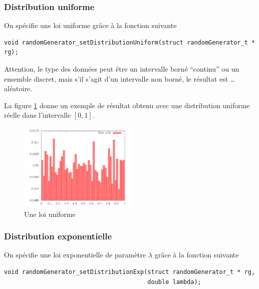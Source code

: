 %
\subsubsection{Distribution uniforme}

   On spécifie une loi uniforme grâce à la fonction suivante

\begin{verbatim}
void randomGenerator_setDistributionUniform(struct randomGenerator_t * rg);
\end{verbatim}

   Attention, le type des données peut être un intervalle borné
``continu'' ou un ensemble discret, mais s'il s'agit d'un intervalle
non borné, le résultat est \ldots {} aléatoire.

   La figure \ref{figure:distuni} donne un exemple de résultat obtenu
avec une distribution uniforme réelle dans l'intervalle $[0, 1]$.

\begin{figure}[h]
\begin{center}
\includegraphics[width=0.5\textwidth]{DistributionUnif.png}
\caption{Une loi uniforme\label{figure:distuni}}
\end{center}
\end{figure}

%
\subsubsection{Distribution exponentielle}

   On spécifie une loi exponentielle de paramètre $\lambda$ grâce à la
fonction suivante 

\begin{verbatim}
void randomGenerator_setDistributionExp(struct randomGenerator_t * rg,
                                        double lambda);

\end{verbatim}

